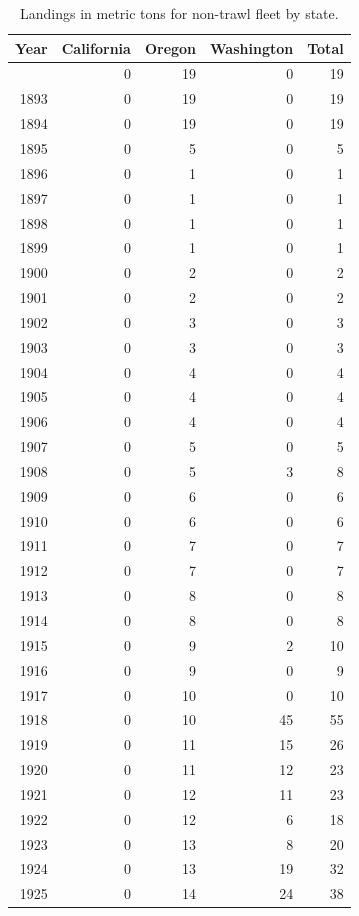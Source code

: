 \documentclass[
  english,
]{article}
\begin{document}
\begin{longtable}{rrrrr}

\caption{\label{tbl-NT_landings}Landings in metric tons for non-trawl
fleet by state.}

\tabularnewline

\toprule
Year & California & Oregon & Washington & Total \\ 
\midrule\addlinespace[2.5pt]
1892 & 0 & 19 & 0 & 19 \\ 
1893 & 0 & 19 & 0 & 19 \\ 
1894 & 0 & 19 & 0 & 19 \\ 
1895 & 0 & 5 & 0 & 5 \\ 
1896 & 0 & 1 & 0 & 1 \\ 
1897 & 0 & 1 & 0 & 1 \\ 
1898 & 0 & 1 & 0 & 1 \\ 
1899 & 0 & 1 & 0 & 1 \\ 
1900 & 0 & 2 & 0 & 2 \\ 
1901 & 0 & 2 & 0 & 2 \\ 
1902 & 0 & 3 & 0 & 3 \\ 
1903 & 0 & 3 & 0 & 3 \\ 
1904 & 0 & 4 & 0 & 4 \\ 
1905 & 0 & 4 & 0 & 4 \\ 
1906 & 0 & 4 & 0 & 4 \\ 
1907 & 0 & 5 & 0 & 5 \\ 
1908 & 0 & 5 & 3 & 8 \\ 
1909 & 0 & 6 & 0 & 6 \\ 
1910 & 0 & 6 & 0 & 6 \\ 
1911 & 0 & 7 & 0 & 7 \\ 
1912 & 0 & 7 & 0 & 7 \\ 
1913 & 0 & 8 & 0 & 8 \\ 
1914 & 0 & 8 & 0 & 8 \\ 
1915 & 0 & 9 & 2 & 10 \\ 
1916 & 0 & 9 & 0 & 9 \\ 
1917 & 0 & 10 & 0 & 10 \\ 
1918 & 0 & 10 & 45 & 55 \\ 
1919 & 0 & 11 & 15 & 26 \\ 
1920 & 0 & 11 & 12 & 23 \\ 
1921 & 0 & 12 & 11 & 23 \\ 
1922 & 0 & 12 & 6 & 18 \\ 
1923 & 0 & 13 & 8 & 20 \\ 
1924 & 0 & 13 & 19 & 32 \\ 
1925 & 0 & 14 & 24 & 38 \\ 

\end{longtable}
\end{document}
